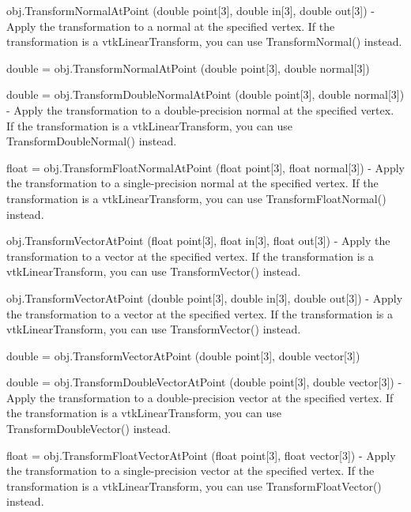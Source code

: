\begin{DoxyItemize}
\item {\ttfamily obj.\-Transform\-Normal\-At\-Point (double point\mbox{[}3\mbox{]}, double in\mbox{[}3\mbox{]}, double out\mbox{[}3\mbox{]})} -\/ Apply the transformation to a normal at the specified vertex. If the transformation is a vtk\-Linear\-Transform, you can use Transform\-Normal() instead.  
\item {\ttfamily double = obj.\-Transform\-Normal\-At\-Point (double point\mbox{[}3\mbox{]}, double normal\mbox{[}3\mbox{]})}  
\item {\ttfamily double = obj.\-Transform\-Double\-Normal\-At\-Point (double point\mbox{[}3\mbox{]}, double normal\mbox{[}3\mbox{]})} -\/ Apply the transformation to a double-\/precision normal at the specified vertex. If the transformation is a vtk\-Linear\-Transform, you can use Transform\-Double\-Normal() instead.  
\item {\ttfamily float = obj.\-Transform\-Float\-Normal\-At\-Point (float point\mbox{[}3\mbox{]}, float normal\mbox{[}3\mbox{]})} -\/ Apply the transformation to a single-\/precision normal at the specified vertex. If the transformation is a vtk\-Linear\-Transform, you can use Transform\-Float\-Normal() instead.  
\item {\ttfamily obj.\-Transform\-Vector\-At\-Point (float point\mbox{[}3\mbox{]}, float in\mbox{[}3\mbox{]}, float out\mbox{[}3\mbox{]})} -\/ Apply the transformation to a vector at the specified vertex. If the transformation is a vtk\-Linear\-Transform, you can use Transform\-Vector() instead.  
\item {\ttfamily obj.\-Transform\-Vector\-At\-Point (double point\mbox{[}3\mbox{]}, double in\mbox{[}3\mbox{]}, double out\mbox{[}3\mbox{]})} -\/ Apply the transformation to a vector at the specified vertex. If the transformation is a vtk\-Linear\-Transform, you can use Transform\-Vector() instead.  
\item {\ttfamily double = obj.\-Transform\-Vector\-At\-Point (double point\mbox{[}3\mbox{]}, double vector\mbox{[}3\mbox{]})}  
\item {\ttfamily double = obj.\-Transform\-Double\-Vector\-At\-Point (double point\mbox{[}3\mbox{]}, double vector\mbox{[}3\mbox{]})} -\/ Apply the transformation to a double-\/precision vector at the specified vertex. If the transformation is a vtk\-Linear\-Transform, you can use Transform\-Double\-Vector() instead.  
\item {\ttfamily float = obj.\-Transform\-Float\-Vector\-At\-Point (float point\mbox{[}3\mbox{]}, float vector\mbox{[}3\mbox{]})} -\/ Apply the transformation to a single-\/precision vector at the specified vertex. If the transformation is a vtk\-Linear\-Transform, you can use Transform\-Float\-Vector() instead.  

\end{DoxyItemize}
